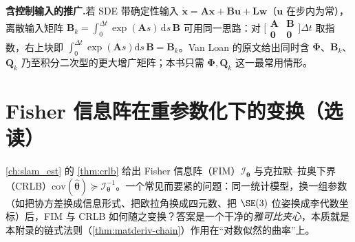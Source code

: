 \begin{note}
\textbf{含控制输入的推广.}\;若 SDE 带确定性输入 $\dot{\mathbf{x}}=\mathbf{A}\mathbf{x}+\mathbf{B}\mathbf{u}+\mathbf{L}\mathbf{w}$（$\mathbf{u}$ 在步内为常），离散输入矩阵 $\mathbf{B}_k=\int_0^{\Delta t}\exp(\mathbf{A}s)\,\mathrm{d}s\,\mathbf{B}$ 可用同一思路：对 $\big[\begin{smallmatrix}\mathbf{A}&\mathbf{B}\\\mathbf{0}&\mathbf{0}\end{smallmatrix}\big]\Delta t$ 取指数，右上块即 $\int_0^{\Delta t}\exp(\mathbf{A}s)\mathrm{d}s\,\mathbf{B}=\mathbf{B}_k$。Van Loan 的原文给出同时含 $\boldsymbol{\Phi}$、$\mathbf{B}_k$、$\mathbf{Q}_k$ 乃至积分二次型的更大增广矩阵\cite{vanloan1978computing}；本书只需 $\boldsymbol{\Phi},\mathbf{Q}_k$ 这一最常用情形。
\end{note}

\section{Fisher 信息阵在重参数化下的变换（选读）}
\label{sec:matderiv-fim}

\cref{ch:slam_est} 的 \cref{thm:crlb} 给出 Fisher 信息阵（FIM）$\boldsymbol{\mathcal{I}}_{\boldsymbol{\theta}}$ 与克拉默--拉奥下界（CRLB）$\mathrm{cov}(\hat{\boldsymbol{\theta}})\succeq\boldsymbol{\mathcal{I}}_{\boldsymbol{\theta}}^{-1}$。一个常见而要紧的问题：同一统计模型，换一组参数（如把协方差换成信息形式、把欧拉角换成四元数、把 $\SE(3)$ 位姿换成李代数坐标）后，FIM 与 CRLB 如何随之变换？答案是一个干净的\emph{雅可比夹心}，本质就是本附录的链式法则（\cref{thm:matderiv-chain}）作用在“对数似然的曲率”上。

